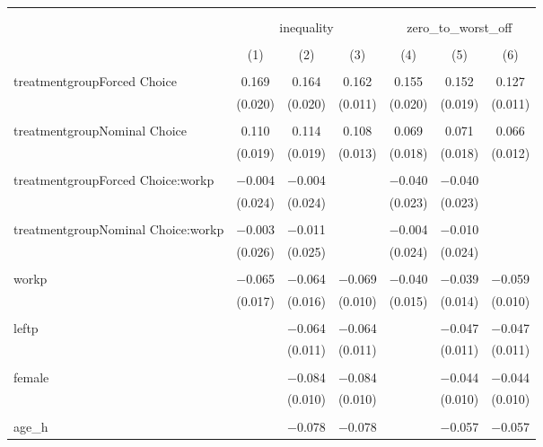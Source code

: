
\begin{table}[!htbp] \centering 
  \caption{} 
  \label{tbl:o1} 
\begin{tabular}{@{\extracolsep{5pt}}lcccccc} 
\\[-1.8ex]\hline 
\hline \\[-1.8ex] 
\\[-1.8ex] & \multicolumn{3}{c}{inequality} & \multicolumn{3}{c}{zero\_to\_worst\_off} \\ 
\\[-1.8ex] & (1) & (2) & (3) & (4) & (5) & (6)\\ 
\hline \\[-1.8ex] 
 treatmentgroupForced Choice & 0.169 & 0.164 & 0.162 & 0.155 & 0.152 & 0.127 \\ 
  & (0.020) & (0.020) & (0.011) & (0.020) & (0.019) & (0.011) \\ 
  & & & & & & \\ 
 treatmentgroupNominal Choice & 0.110 & 0.114 & 0.108 & 0.069 & 0.071 & 0.066 \\ 
  & (0.019) & (0.019) & (0.013) & (0.018) & (0.018) & (0.012) \\ 
  & & & & & & \\ 
 treatmentgroupForced Choice:workp & $-$0.004 & $-$0.004 &  & $-$0.040 & $-$0.040 &  \\ 
  & (0.024) & (0.024) &  & (0.023) & (0.023) &  \\ 
  & & & & & & \\ 
 treatmentgroupNominal Choice:workp & $-$0.003 & $-$0.011 &  & $-$0.004 & $-$0.010 &  \\ 
  & (0.026) & (0.025) &  & (0.024) & (0.024) &  \\ 
  & & & & & & \\ 
 workp & $-$0.065 & $-$0.064 & $-$0.069 & $-$0.040 & $-$0.039 & $-$0.059 \\ 
  & (0.017) & (0.016) & (0.010) & (0.015) & (0.014) & (0.010) \\ 
  & & & & & & \\ 
 leftp &  & $-$0.064 & $-$0.064 &  & $-$0.047 & $-$0.047 \\ 
  &  & (0.011) & (0.011) &  & (0.011) & (0.011) \\ 
  & & & & & & \\ 
 female &  & $-$0.084 & $-$0.084 &  & $-$0.044 & $-$0.044 \\ 
  &  & (0.010) & (0.010) &  & (0.010) & (0.010) \\ 
  & & & & & & \\ 
 age\_h &  & $-$0.078 & $-$0.078 &  & $-$0.057 & $-$0.057 \\ 

\end{tabular}
\end{table}
